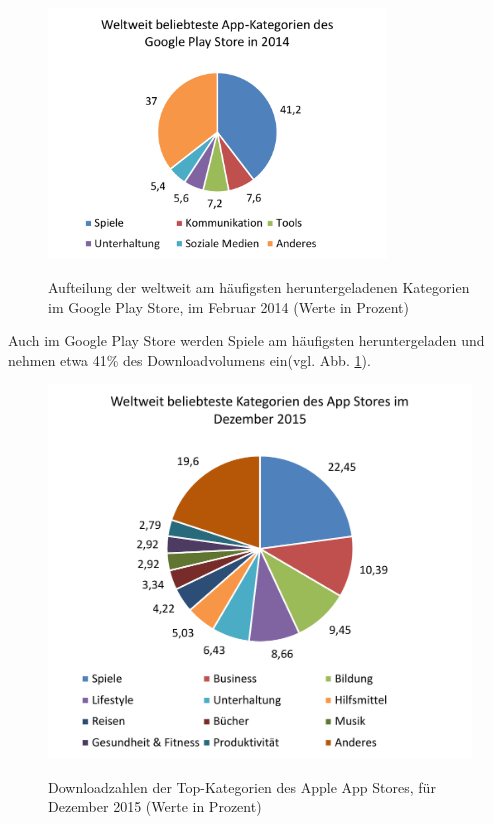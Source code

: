 \begin{figure}[htbp]
	\centering
	\includegraphics[width=0.8\textwidth]{Bilder/Google_Play_Store_Kategorien}
	\caption{Aufteilung der weltweit am häufigsten heruntergeladenen Kategorien im Google Play Store, im Februar 2014 (Werte in Prozent)}\label{graph_play_store_kategorien}\citep{play_store_categories}
\end{figure}

Auch im Google Play Store werden Spiele am häufigsten heruntergeladen und nehmen etwa 41\% des Downloadvolumens ein(vgl. Abb. \ref{graph_play_store_kategorien}).

\begin{figure}[htbp]
	\centering
	\includegraphics[width=1\textwidth]{Bilder/Top_Kategorien_App_Store}
	\caption{Downloadzahlen der Top-Kategorien des Apple App Stores, für Dezember 2015 (Werte in Prozent)}\label{graph_app_store_kategorien}\citep{app_store_categories}
\end{figure}

